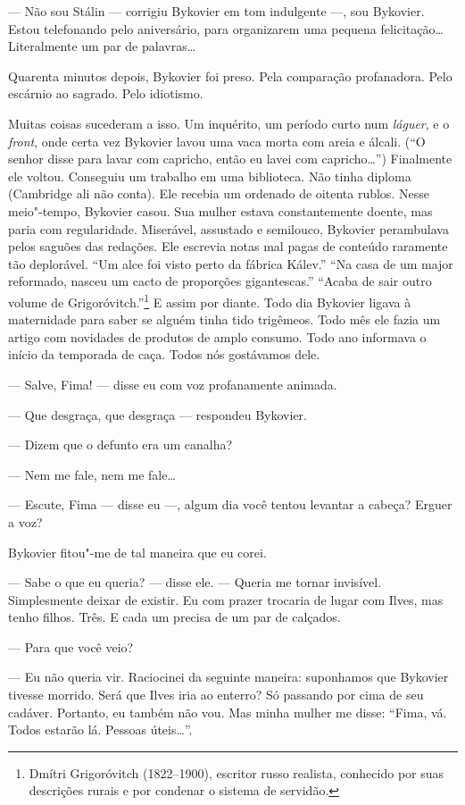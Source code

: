 --- Não sou Stálin --- corrigiu Bykovier em tom indulgente ---, sou
Bykovier. Estou telefonando pelo aniversário, para organizarem uma
pequena felicitação\ldots{} Literalmente um par de palavras\ldots{}

Quarenta minutos depois, Bykovier foi preso. Pela comparação
profanadora. Pelo escárnio ao sagrado. Pelo idiotismo.

Muitas coisas sucederam a isso. Um inquérito, um período curto num
\emph{láguer}, e o \emph{front}, onde certa vez Bykovier lavou uma vaca
morta com areia e álcali. (``O senhor disse para lavar com capricho,
então eu lavei com capricho\ldots{}'') Finalmente ele voltou. Conseguiu um
trabalho em uma biblioteca. Não tinha diploma (Cambridge ali não conta).
Ele recebia um ordenado de oitenta rublos. Nesse meio"-tempo, Bykovier
casou. Sua mulher estava constantemente doente, mas paria com
regularidade. Miserável, assustado e semilouco, Bykovier perambulava
pelos saguões das redações. Ele escrevia notas mal pagas de conteúdo
raramente tão deplorável. ``Um alce foi visto perto da fábrica Kálev.''
``Na casa de um major reformado, nasceu um cacto de proporções
gigantescas.'' ``Acaba de sair outro volume de Grigoróvitch.''\footnote{Dmítri
  Grigoróvitch (1822--1900), escritor russo realista, conhecido por suas
  descrições rurais e por condenar o sistema de servidão.} E assim por
diante. Todo dia Bykovier ligava à maternidade para saber se alguém
tinha tido trigêmeos. Todo mês ele fazia um artigo com novidades de
produtos de amplo consumo. Todo ano informava o início da temporada de
caça. Todos nós gostávamos dele.

--- Salve, Fima! --- disse eu com voz profanamente animada.

--- Que desgraça, que desgraça --- respondeu Bykovier.

--- Dizem que o defunto era um canalha?

--- Nem me fale, nem me fale\ldots{}

--- Escute, Fima --- disse eu ---, algum dia você tentou levantar a
cabeça? Erguer a voz?

Bykovier fitou"-me de tal maneira que eu corei.

--- Sabe o que eu queria? --- disse ele. --- Queria me tornar invisível.
Simplesmente deixar de existir. Eu com prazer trocaria de lugar com
Ilves, mas tenho filhos. Três. E cada um precisa de um par de calçados.

--- Para que você veio?

--- Eu não queria vir. Raciocinei da seguinte maneira: suponhamos que
Bykovier tivesse morrido. Será que Ilves iria ao enterro? Só passando
por cima de seu cadáver. Portanto, eu também não vou. Mas minha mulher
me disse: ``Fima, vá. Todos estarão lá. Pessoas úteis\ldots{}''.

